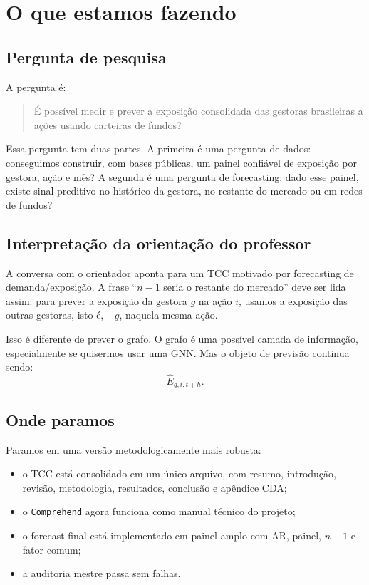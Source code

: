 \documentclass[11pt,a4paper]{article}
\begin{document}
\section{O que estamos fazendo}

\subsection{Pergunta de pesquisa}

A pergunta é:

\begin{quote}
É possível medir e prever a exposição consolidada das gestoras brasileiras a ações usando carteiras de fundos?
\end{quote}

Essa pergunta tem duas partes. A primeira é uma pergunta de dados: conseguimos construir, com bases públicas,
um painel confiável de exposição por gestora, ação e mês? A segunda é uma pergunta de forecasting: dado esse
painel, existe sinal preditivo no histórico da gestora, no restante do mercado ou em redes de fundos?

\subsection{Interpretação da orientação do professor}

A conversa com o orientador aponta para um TCC motivado por forecasting de demanda/exposição. A frase
``$n-1$ seria o restante do mercado'' deve ser lida assim: para prever a exposição da gestora $g$ na ação
$i$, usamos a exposição das outras gestoras, isto é, $-g$, naquela mesma ação.

Isso é diferente de prever o grafo. O grafo é uma possível camada de informação, especialmente se quisermos
usar uma GNN. Mas o objeto de previsão continua sendo:
\[
\widehat{E}_{g,i,t+h}.
\]

\subsection{Onde paramos}

Paramos em uma versão metodologicamente mais robusta:
\begin{itemize}
\item o TCC está consolidado em um único arquivo, com resumo, introdução, revisão, metodologia, resultados,
conclusão e apêndice CDA;
\item o \texttt{Comprehend} agora funciona como manual técnico do projeto;
\item o forecast final está implementado em painel amplo com AR, painel, $n-1$ e fator comum;
\item a auditoria mestre passa sem falhas.
\end{itemize}
\end{document}
